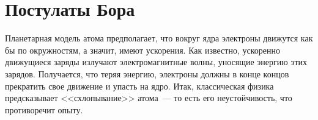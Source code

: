 \documentclass[main.tex]{subfiles}
\begin{document}

 

 

 
   

\section{Постулаты Бора}



Планетарная модель атома предполагает, что вокруг ядра электроны движутся как бы по окружностям, а значит, имеют ускорения. Как известно, ускоренно движущиеся заряды излучают электромагнитные волны, уносящие энергию этих зарядов. Получается, что теряя энергию, электроны должны в конце концов прекратить свое движение и упасть на ядро. Итак, классическая физика предсказывает <<схлопывание>> атома~--- то есть его неустойчивость, что противоречит опыту. 
\end{document}
